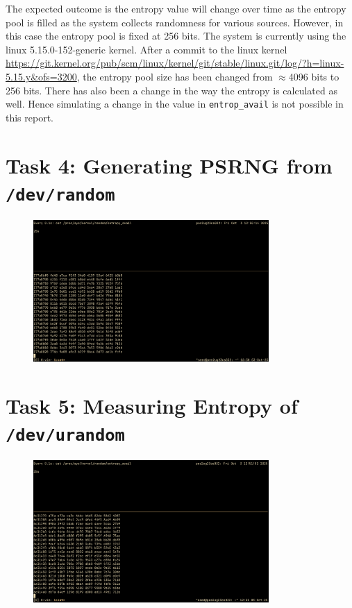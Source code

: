 \documentclass[12pt,a4paper]{article}
\begin{document}
The expected outcome is the entropy value will change over time as the entropy pool is filled as the system collects randomness for various sources. However, in this case the entropy pool is fixed at 256 bits. The system is currently using the linux 5.15.0-152-generic kernel. After a commit to the linux kernel \url{https://git.kernel.org/pub/scm/linux/kernel/git/stable/linux.git/log/?h=linux-5.15.y&ofs=3200}, the entropy pool size has been changed from $\approx$4096 bits to 256 bits. There has also been a change in the way the entropy is calculated as well. Hence simulating a change in the value in \texttt{entrop\_avail} is not possible in this report.

\section{Task 4: Generating PSRNG from \texttt{/dev/random}}

\begin{figure}[H]
    \centering
    \includegraphics[width=0.8\textwidth]{./images/task4.png} 
\end{figure}

\section{Task 5: Measuring Entropy of \texttt{/dev/urandom}}

\begin{figure}[H]
    \centering
    \includegraphics[width=0.8\textwidth]{./images/task5-1.png} 
\end{figure}
\end{document}
